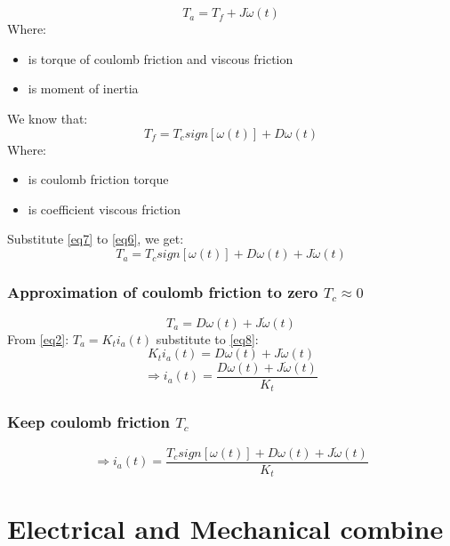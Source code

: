 \documentclass[12pt,a4paper]{article}
\begin{document}
	\begin{equation}
		T_a = T_f + J \dot{\omega}(t)
		\label{eq6}
	\end{equation}
	Where:
	\begin{itemize}
		\item { is torque of coulomb friction and viscous friction }
		\item { is moment of inertia}
	\end{itemize}
	We know that:
	\begin{equation}
		T_f = T_c sign[\omega(t)]+D\omega(t)
		\label{eq7}
	\end{equation}
	Where:
	\begin{itemize}
		\item { is coulomb friction torque}
		\item { is coefficient viscous friction}
	\end{itemize}
	Substitute \autoref{eq7} to \autoref{eq6}, we get:
	\[T_a = T_c sign[\omega(t)]+D\omega(t) + J \dot{\omega}(t)\]
	
	\subsubsection{Approximation of coulomb friction to zero \(T_c \approx 0\)}
	\begin{equation}
		T_a = D\omega(t) + J \dot{\omega}(t)
		\label{eq8}
	\end{equation}
	From \autoref{eq2}: \(T_a = K_t i_a(t)\) substitute to \autoref{eq8}:
	\[K_t i_a(t) = D\omega(t) + J \dot{\omega}(t)\]
	\begin{equation}
		\Rightarrow \boxed{i_a(t) = \frac{D\omega(t) + J \dot{\omega}(t)}{K_t}}
		\label{eq9}
	\end{equation}
	
	\subsubsection{Keep coulomb friction \(T_c\)}
	\begin{equation}
		\Rightarrow \boxed{i_a(t) = \frac{T_c sign[\omega(t)] + D\omega(t) + J \dot{\omega}(t)}{K_t}}
		\label{eq10}
	\end{equation}

	\section{Electrical and Mechanical combine}
\end{document}
